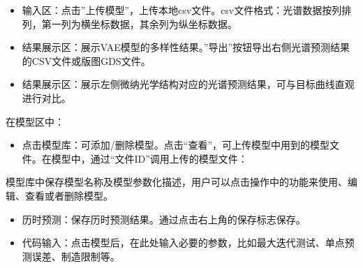 \documentclass[a4paper,10pt,english]{sphinxmanual}
\begin{document}
{{{{\begin{itemize}
\item {} 
\sphinxAtStartPar
输入区：点击”上传模型”，上传本地csv文件。csv文件格式：光谱数据按列排列，第一列为横坐标数据，其余列为纵坐标数据。

\item {} 
\sphinxAtStartPar
结果展示区：展示VAE模型的多样性结果。”导出”按钮导出右侧光谱预测结果的CSV文件或版图GDS文件。

\item {} 
\sphinxAtStartPar
结果展示区：展示左侧微纳光学结构对应的光谱预测结果，可与目标曲线直观进行对比。

\end{itemize}

\sphinxAtStartPar
{}



\sphinxAtStartPar
在模型区中：
\begin{itemize}
\item {} 
\sphinxAtStartPar
点击模型库：可添加/删除模型。点击“查看”，可上传模型中用到的模型文件。在模型中，通过“文件ID”调用上传的模型文件：

\end{itemize}

\begin{sphinxVerbatim}[commandchars=\\\{\}]
  
  
\end{sphinxVerbatim}

\sphinxAtStartPar
模型库中保存模型名称及模型参数化描述，用户可以点击操作中的功能来使用、编辑、查看或者删除模型。


\begin{itemize}
\item {} 
\sphinxAtStartPar
历时预测：保存历时预测结果。通过点击右上角的保存标志保存。

\item {} 
\sphinxAtStartPar
代码输入：点击模型后，在此处输入必要的参数，比如最大迭代测试、单点预测误差、制造限制等。


\end{itemize}}}}}
\end{document}
